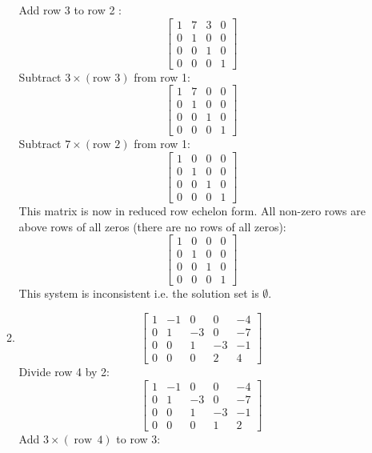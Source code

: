 \begin{enumerate}[(a)]
\begin{enumerate}[i]
        Add row 3 to row 2 :
        $$\left[\begin{array}{lll|l}1 & 7 & 3 & 0 \\ 0 & 1 & 0 & 0 \\ 0 & 0 & 1 & 0 \\ 0 & 0 & 0 & 1\end{array}\right]$$
        Subtract $3 \times(\text {row 3})$ from row 1:
        $$\left[\begin{array}{lll|l}1 & 7 & 0 & 0 \\ 0 & 1 & 0 & 0 \\ 0 & 0 & 1 & 0 \\ 0 & 0 & 0 & 1\end{array}\right]$$
        Subtract $7 \times(\text {row 2})$ from row 1:
        $$\left[\begin{array}{lll|l}1 & 0 & 0 & 0 \\ 0 & 1 & 0 & 0 \\ 0 & 0 & 1 & 0 \\ 0 & 0 & 0 & 1\end{array}\right]$$
        This matrix is now in reduced row echelon form.
        All non-zero rows are above rows of all zeros (there are no rows of all zeros):
        $$\left[\begin{array}{lll|l}1 & 0 & 0 & 0 \\ 0 & 1 & 0 & 0 \\ 0 & 0 & 1 & 0 \\ 0 & 0 & 0 & 1\end{array}\right]$$
        This system is inconsistent i.e. the solution set is $\emptyset$.
        \item
        $$
        \left[\begin{array}{rrrr|r}
            1 & -1 & 0 & 0 & -4 \\
            0 & 1 & -3 & 0 & -7 \\
            0 & 0 & 1 & -3 & -1 \\
            0 & 0 & 0 & 2 & 4
        \end{array}\right]
        $$
        Divide row 4 by 2:
        \[
        \left[\begin{array}{cccc|c}
        1 & -1 & 0 & 0 & -4 \\
        0 & 1 & -3 & 0 & -7 \\
        0 & 0 & 1 & -3 & -1 \\
        0 & 0 & 0 & 1 & 2
        \end{array}\right]
        \]
        Add $3 \times(\operatorname{row}\,4)$ to row 3:

\end{enumerate}
\end{enumerate}
